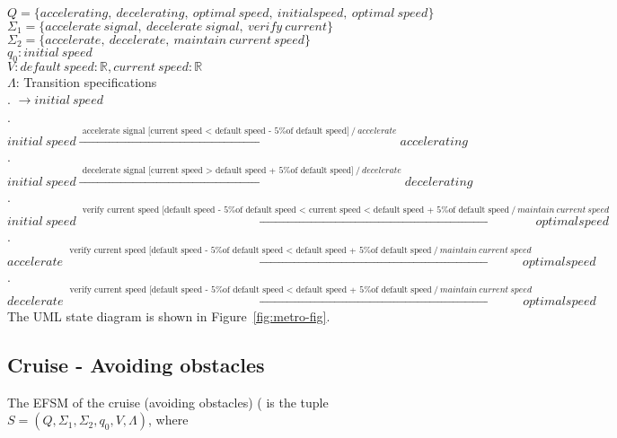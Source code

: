 \documentclass[12pt]{article}
\begin{document}
\begin{spacing}{1.5}
\noindent $Q = \{accelerating,~decelerating,~optimal~speed,~initial speed,~optimal~speed\}$\\
\noindent $\Sigma_1 = \{accelerate~signal,~decelerate~signal,~ verify~current\}$\\
\noindent $\Sigma_2 = \{accelerate,~decelerate,~maintain~current~speed\}$\\
\noindent $q_0: initial~speed$\\
\noindent $V: default~speed: \mathbb R, current~speed: \mathbb R$\\
\noindent $\Lambda$: Transition specifications\\
. $\rightarrow initial~speed$\\
. $initial~speed \xrightarrow {\text { accelerate signal [current speed < default speed - 5\% of default speed]}~/ ~accelerate} accelerating$\\
. $initial~speed \xrightarrow {\text { decelerate signal [current speed > default speed + 5\% of default speed]}~/ ~decelerate} decelerating$\\
. $initial~speed \xrightarrow {\text { verify current speed [default speed - 5\% of default speed < current speed < default speed + 5\% of default speed}~/~maintain~current~speed} optimal speed$\\
. $accelerate \xrightarrow {\text { verify current speed [default speed - 5\% of default speed < default speed + 5\% of default speed}~/~maintain~current~speed} optimal speed$\\
. $decelerate \xrightarrow {\text { verify current speed [default speed - 5\% of default speed < default speed + 5\% of default speed}~/~maintain~current~speed} optimal speed$\\


\noindent The UML state diagram is shown in Figure~\ref{fig:metro-fig}.
\newpage

\subsection{Cruise - Avoiding obstacles}

\noindent The EFSM of the cruise (avoiding obstacles) ( is the tuple $S = (Q, \Sigma_1, \Sigma_2, q_0, V, \Lambda)$, where\\


\end{spacing}
\end{document}
